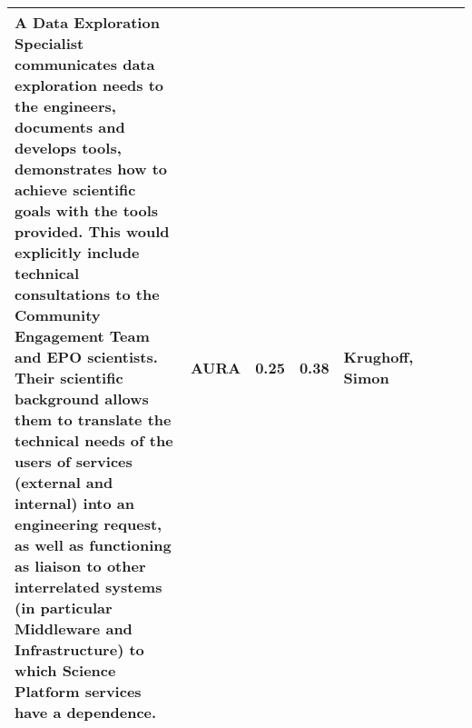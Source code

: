 \begin{longtable} {|l|p{}|p{}|p{}|l|l|l|p{}|}
{A Data Exploration Specialist communicates data exploration needs to the engineers, documents and develops tools, demonstrates how to achieve scientific goals with the tools provided. This would explicitly include technical consultations to the Community Engagement Team and EPO scientists. Their scientific background allows them to translate the technical needs of the users of services (external and internal) into an engineering request, as well as functioning as liaison to other interrelated systems (in particular Middleware and Infrastructure) to which Science Platform services have a dependence.}&{AURA}&{0.25}&{0.38}&{Krughoff, Simon} \\ \hline
\end{longtable} \normalsize
